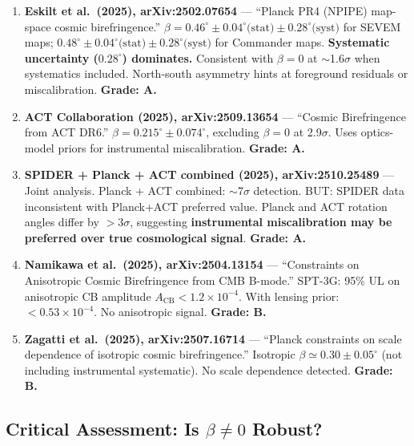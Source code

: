 \documentclass[11pt,a4paper]{article}
\begin{document}
\begin{enumerate}

\item \textbf{Eskilt et al.\ (2025), arXiv:2502.07654} --- ``Planck PR4 (NPIPE) map-space cosmic birefringence.'' $\beta = 0.46^\circ \pm 0.04^\circ\text{(stat)} \pm 0.28^\circ\text{(syst)}$ for SEVEM maps; $0.48^\circ \pm 0.04^\circ\text{(stat)} \pm 0.28^\circ\text{(syst)}$ for Commander maps. \textbf{Systematic uncertainty ($0.28^\circ$) dominates.} Consistent with $\beta = 0$ at $\sim$1.6$\sigma$ when systematics included. North-south asymmetry hints at foreground residuals or miscalibration. \textbf{Grade: A.}

\item \textbf{ACT Collaboration (2025), arXiv:2509.13654} --- ``Cosmic Birefringence from ACT DR6.'' $\beta = 0.215^\circ \pm 0.074^\circ$, excluding $\beta = 0$ at 2.9$\sigma$. Uses optics-model priors for instrumental miscalibration. \textbf{Grade: A.}

\item \textbf{SPIDER + Planck + ACT combined (2025), arXiv:2510.25489} --- Joint analysis. Planck + ACT combined: $\sim$7$\sigma$ detection. BUT: SPIDER data inconsistent with Planck+ACT preferred value. Planck and ACT rotation angles differ by $>$3$\sigma$, suggesting \textbf{instrumental miscalibration may be preferred over true cosmological signal}. \textbf{Grade: A.}

\item \textbf{Namikawa et al.\ (2025), arXiv:2504.13154} --- ``Constraints on Anisotropic Cosmic Birefringence from CMB B-mode.'' SPT-3G: 95\% UL on anisotropic CB amplitude $A_\mathrm{CB} < 1.2\times10^{-4}$. With lensing prior: $< 0.53\times10^{-4}$. No anisotropic signal. \textbf{Grade: B.}

\item \textbf{Zagatti et al.\ (2025), arXiv:2507.16714} --- ``Planck constraints on scale dependence of isotropic cosmic birefringence.'' Isotropic $\beta \simeq 0.30 \pm 0.05^\circ$ (not including instrumental systematic). No scale dependence detected. \textbf{Grade: B.}

\end{enumerate}

\subsection{Critical Assessment: Is $\beta \neq 0$ Robust?}
\end{document}
